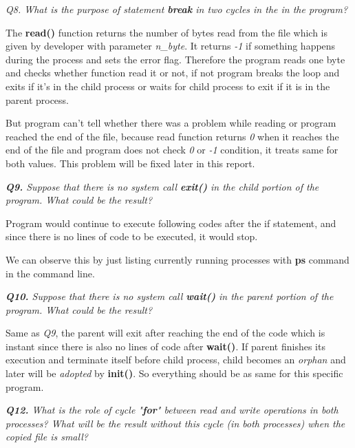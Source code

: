 \documentclass[11pt]{article}
\begin{document}
\vspace{5mm}
\textit{Q8. What is the purpose of statement \textbf{break} in two cycles in the in the program?}
\vspace{5mm}

The \textbf{read()} function returns the number of bytes read from the file which is given by developer with parameter \textit{n\_byte}. It returns \textit{-1} if something happens during the process and sets the error flag. Therefore the program reads one byte and checks whether function read it or not, if not program breaks the loop and exits if it's in the child process or waits for child process to exit if it is in the parent process. 

But program can't tell whether there was a problem while reading or program reached the end of the file, because read function returns \textit{0} when it reaches the end of the file and program does not check \textit{0} or \textit{-1} condition, it treats same for both values. This problem will be fixed later in this report.


\vspace{5mm}
\textit{\textbf{Q9.} Suppose that there is no system call \textbf{exit()} in the child portion of the program. What could be the result?}
\vspace{5mm}

Program would continue to execute following codes after the if statement, and since there is no lines of code to be executed, it would stop. 

We can observe this by just listing currently running processes with \textbf{ps} command in the command line.

\vspace{5mm}
\textit{\textbf{Q10.} Suppose that there is no system call \textbf{wait()} in the parent portion of the program. What could be the result?}
\vspace{5mm}

Same as \textit{Q9}, the parent will exit after reaching the end of the code which is instant since there is also no lines of code after \textbf{wait()}. If parent finishes its execution and terminate itself before child process, child becomes an \textit{orphan} and later will be \textit{adopted} by \textbf{init()}. So everything should be as same for this specific program.

\vspace{5mm}
\textit{\textbf{Q12.} What is the role of cycle "\textbf{for}" between read and write operations in both processes? What will be the result without this cycle (in both processes) when the copied file is small?}
\vspace{5mm}
\end{document}
